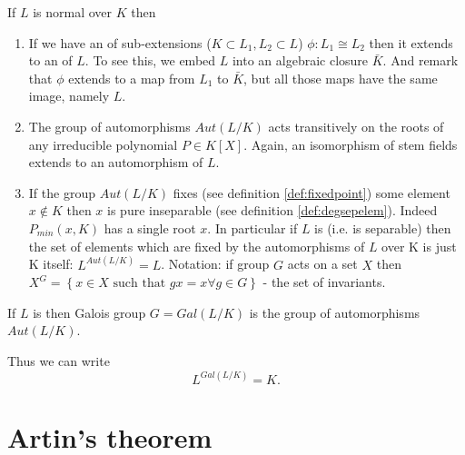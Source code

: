 \begin{remark}
  If $L$ is normal over $K$ then
  \begin{enumerate}
  \item If we have an  of sub-extensions
    ($K \subset L_1, L_2 \subset L$)
    $\phi: L_1 \cong L_2$ then it extends to an
     of $L$.  To see this, we embed $L$ into
    an algebraic closure $\bar{K}$. And remark that $\phi$ extends to a
    map from $L_1$ to $\bar{K}$, but all those maps have the same image,
    namely $L$.  
  \item The group of automorphisms $Aut\left(L/K\right)$ acts
    transitively on the roots of any irreducible polynomial $P \in
    K\left[X\right]$. Again, an isomorphism of stem fields extends to
    an automorphism of $L$.
  \item If the group $Aut\left(L/K\right)$ fixes (see definition
    \ref{def:fixedpoint}) some element $x 
    \notin K$ then $x$ is pure inseparable (see definition
    \ref{def:degsepelem}). Indeed $P_{min}\left(x, K\right)$ has a
    single root $x$. In particular if $L$ is
     (i.e. is separable) then
      the set of elements which are fixed  by the automorphisms  of $L$
      over K is just K itself: 
      $L^{Aut\left(L/K\right)} = L$.
      Notation: if group $G$ acts on a set $X$ then $X^G = \left\{x
      \in X \mbox{ such that } gx = x \forall g \in G\right\}$ - the
      set of invariants.
  \end{enumerate}
\end{remark}

\begin{definition}
  If $L$ is  then Galois group $G =
  Gal\left(L/K\right)$ is the group of automorphisms $Aut\left(L/K\right)$. 
  \label{def:galoisgroup}
\end{definition}

Thus we can write
\begin{equation}
  L^{Gal\left(L/K\right)} = K.
  \label{eq:lec5_1}
\end{equation}

\section{Artin's theorem}

